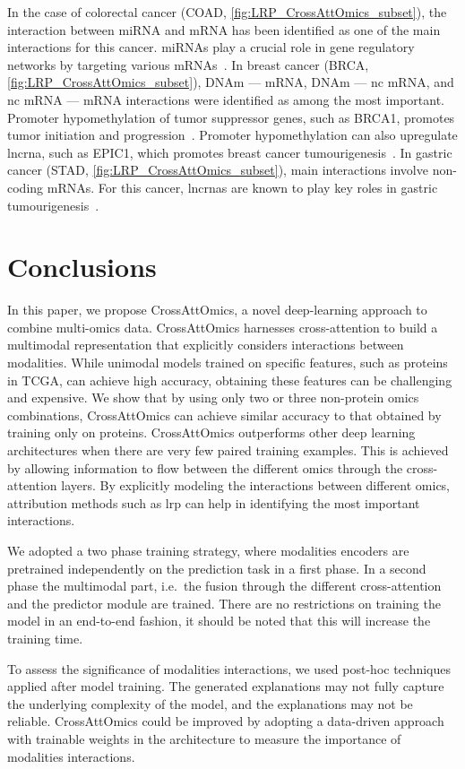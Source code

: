 \documentclass[../main.tex]{subfiles}
\begin{document}
		In the case of colorectal cancer (COAD, \cref{fig:LRP_CrossAttOmics_subset}),  the interaction between miRNA and mRNA has been identified as one of the main interactions for this cancer.
		miRNAs play a crucial role in gene regulatory networks by targeting various mRNAs~\cite{Amirkhah2015}.
		In breast cancer (BRCA, \cref{fig:LRP_CrossAttOmics_subset}), DNAm --- mRNA, DNAm --- nc mRNA, and nc mRNA --- mRNA interactions were identified as among the most important.
		Promoter hypomethylation of tumor suppressor genes, such as BRCA1, promotes tumor initiation and progression~\cite{Szyf2004}.
		Promoter hypomethylation can also upregulate \gls{lncrna}, such as EPIC1, which promotes breast cancer tumourigenesis~\cite{Wang2018}.
		In gastric cancer (STAD, \cref{fig:LRP_CrossAttOmics_subset}), main interactions involve non-coding mRNAs.
		For this cancer, \glspl{lncrna} are known to play key roles in gastric tumourigenesis~\cite{Tan2020}.

\section{Conclusions}
	In this paper, we propose CrossAttOmics, a novel deep-learning approach to combine multi-omics data.
	CrossAttOmics harnesses cross-attention to build a multimodal representation that explicitly considers interactions between modalities.
	While unimodal models trained on specific features, such as proteins in TCGA, can achieve high accuracy, obtaining these features can be challenging and expensive.
	We show that by using only two or three non-protein omics combinations, CrossAttOmics can achieve similar accuracy to that obtained by training only on proteins.
	CrossAttOmics outperforms other deep learning architectures when there are very few paired training examples.
	This is achieved by allowing information to flow between the different omics through the cross-attention layers.
	By explicitly modeling the interactions between different omics, attribution methods such as \gls{lrp} can help in identifying the most important interactions.

	We adopted a two phase training strategy, where modalities encoders are pretrained independently on the prediction task in a first phase.
	In a second phase the multimodal part, i.e.\ the fusion through the different cross-attention and the predictor module are trained.
	There are no restrictions on training the model in an end-to-end fashion, it should be noted that this will increase the training time.

	To assess the significance of modalities interactions, we used post-hoc techniques applied after model training.
	The generated explanations may not fully capture the underlying complexity of the model, and the explanations may not be reliable.
	CrossAttOmics could be improved by adopting a data-driven approach with trainable weights in the architecture to measure the importance of modalities interactions.
\end{document}
